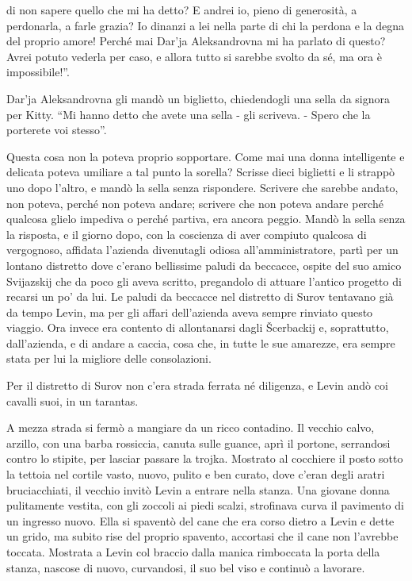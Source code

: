 di non sapere quello che mi ha detto? E andrei io, pieno di generosità, a perdonarla, a farle grazia? Io dinanzi a lei nella parte di chi la perdona e la degna del proprio amore! Perché mai Dar'ja Aleksandrovna mi ha parlato di questo? Avrei potuto vederla per caso, e allora tutto si sarebbe svolto da sé, ma ora è impossibile!''. 

Dar'ja Aleksandrovna gli mandò un biglietto, chiedendogli una sella da signora per Kitty. ``Mi hanno detto che avete una sella - gli scriveva. - Spero che la porterete voi stesso''. 

Questa cosa non la poteva proprio sopportare. Come mai una donna intelligente e delicata poteva umiliare a tal punto la sorella? Scrisse dieci biglietti e li strappò uno dopo l'altro, e mandò la sella senza rispondere. Scrivere che sarebbe andato, non poteva, perché non poteva andare; scrivere che non poteva andare perché qualcosa glielo impediva o perché partiva, era ancora peggio. Mandò la sella senza la risposta, e il giorno dopo, con la coscienza di aver compiuto qualcosa di vergognoso, affidata l'azienda divenutagli odiosa all'amministratore, partì per un lontano distretto dove c'erano bellissime paludi da beccacce, ospite del suo amico Svijazskij che da poco gli aveva scritto, pregandolo di attuare l'antico progetto di recarsi un po' da lui. Le paludi da beccacce nel distretto di Surov tentavano già da tempo Levin, ma per gli affari dell'azienda aveva sempre rinviato questo viaggio. Ora invece era contento di allontanarsi dagli Šcerbackij e, soprattutto, dall'azienda, e di andare a caccia, cosa che, in tutte le sue amarezze, era sempre stata per lui la migliore delle consolazioni. 

Per il distretto di Surov non c'era strada ferrata né diligenza, e Levin andò coi cavalli suoi, in un tarantas. 

A mezza strada si fermò a mangiare da un ricco contadino. Il vecchio calvo, arzillo, con una barba rossiccia, canuta sulle guance, aprì il portone, serrandosi contro lo stipite, per lasciar passare la trojka. Mostrato al cocchiere il posto sotto la tettoia nel cortile vasto, nuovo, pulito e ben curato, dove c'eran degli aratri bruciacchiati, il vecchio invitò Levin a entrare nella stanza. Una giovane donna pulitamente vestita, con gli zoccoli ai piedi scalzi, strofinava curva il pavimento di un ingresso nuovo. Ella si spaventò del cane che era corso dietro a Levin e dette un grido, ma subito rise del proprio spavento, accortasi che il cane non l'avrebbe toccata. Mostrata a Levin col braccio dalla manica rimboccata la porta della stanza, nascose di nuovo, curvandosi, il suo bel viso e continuò a lavorare. 

